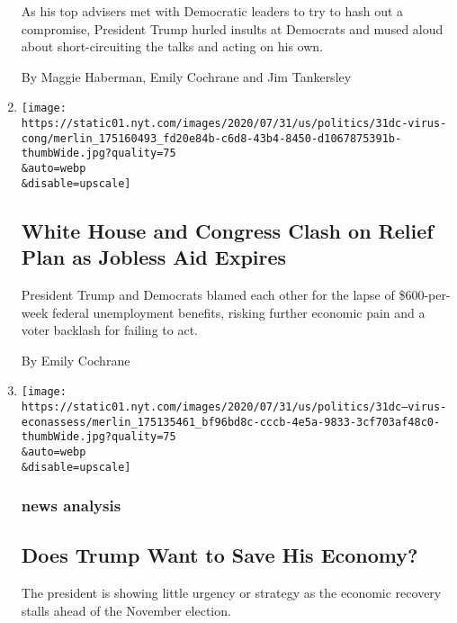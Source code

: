 \begin{enumerate}
  As his top advisers met with Democratic leaders to try to hash out a
  compromise, President Trump hurled insults at Democrats and mused
  aloud about short-circuiting the talks and acting on his own.

  By Maggie Haberman, Emily Cochrane and Jim Tankersley
\item
  \href{/2020/07/31/us/politics/white-house-congress-relief-plan-jobless-aid.html}{}

  \texttt{[image: https://static01.nyt.com/images/2020/07/31/us/politics/31dc-virus-cong/merlin\_175160493\_fd20e84b-c6d8-43b4-8450-d1067875391b-thumbWide.jpg?quality=75\\\&auto=webp\\\&disable=upscale]}

  \hypertarget{white-house-and-congress-clash-on-relief-plan-as-jobless-aid-expires}{%
  \subsection{White House and Congress Clash on Relief Plan as Jobless
  Aid
  Expires}\label{white-house-and-congress-clash-on-relief-plan-as-jobless-aid-expires}}

  President Trump and Democrats blamed each other for the lapse of
  \$600-per-week federal unemployment benefits, risking further economic
  pain and a voter backlash for failing to act.

  By Emily Cochrane
\item
  \href{/2020/07/31/business/coronavirus-trump-economy.html}{}

  \texttt{[image: https://static01.nyt.com/images/2020/07/31/us/politics/31dc--virus-econassess/merlin\_175135461\_bf96bd8c-cccb-4e5a-9833-3cf703af48c0-thumbWide.jpg?quality=75\\\&auto=webp\\\&disable=upscale]}

  \hypertarget{news-analysis-1}{%
  \subsubsection{news analysis}\label{news-analysis-1}}

  \hypertarget{does-trump-want-to-save-his-economy}{%
  \subsection{Does Trump Want to Save His
  Economy?}\label{does-trump-want-to-save-his-economy}}

  The president is showing little urgency or strategy as the economic
  recovery stalls ahead of the November election.


\end{enumerate}
